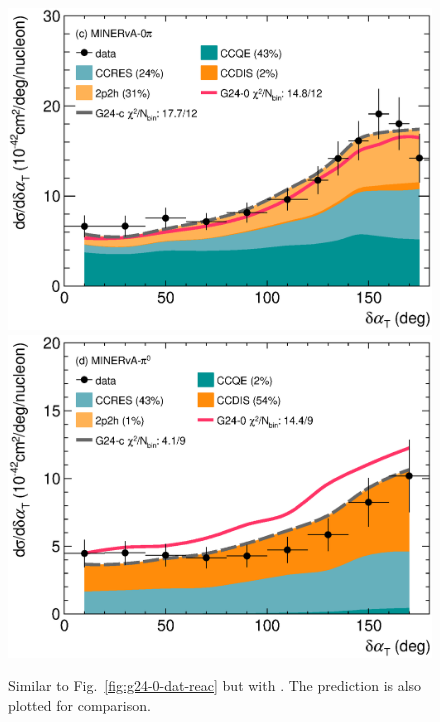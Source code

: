 \begin{figure}
        \includegraphics[width=\dbfigwid\textwidth]{figures/tuning/0026-min_0pi_dalphat_reac_decomp_covfix.eps}
        \includegraphics[width=\dbfigwid\textwidth]{figures/tuning/0026-min_pi0_dalphat_reac_decomp_covfix.eps}
        \caption{\label{fig:g24-c-dat-reac} 
        Similar to Fig.~\ref{fig:g24-0-dat-reac} but with \gC.  The \gZero prediction is also plotted for comparison. 
        } 


\end{figure}
